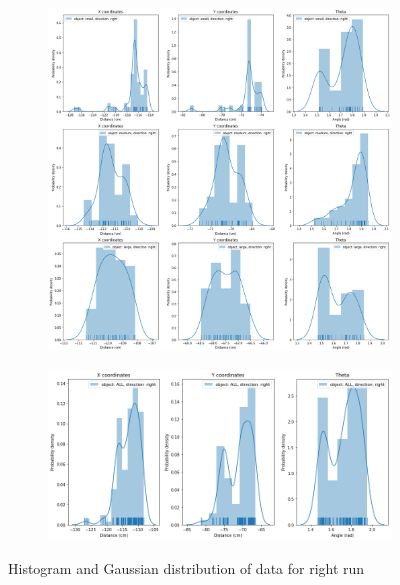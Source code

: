 \documentclass[10pt,a4paper]{article}
\begin{document}
					\begin{figure}[H]
						\begin{subfigure}{\textwidth}
							\centering
							\includegraphics[width=\linewidth]{img/right_hist.png}
						\end{subfigure}
						\begin{subfigure}{\textwidth}
							\centering
							\includegraphics[width=\linewidth]{img/right_hist_combined.png}
						\end{subfigure}
						\caption{Histogram and Gaussian distribution of data for right run}
					\end{figure}
\end{document}
